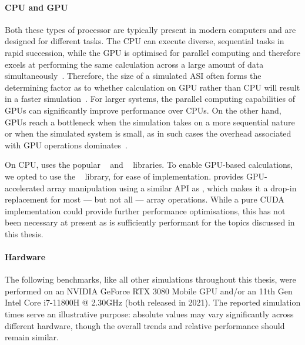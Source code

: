 \paragraph{CPU and GPU}
Both these types of processor are typically present in modern computers and are designed for different tasks.
The CPU can execute diverse, sequential tasks in rapid succession, while the GPU is optimised for parallel computing and therefore excels at performing the same calculation across a large amount of data simultaneously~\cite{owens2008gpu}.
Therefore, the size of a simulated ASI often forms the determining factor as to whether calculation on GPU rather than CPU will result in a faster simulation~\cite{lee2010debunking}.
For larger systems, the parallel computing capabilities of GPUs can significantly improve performance over CPUs.
On the other hand, GPUs reach a bottleneck when the simulation takes on a more sequential nature or when the simulated system is small, as in such cases the overhead associated with GPU operations dominates~\cite{owens2008gpu}. \par
On CPU, \hotspice uses the popular ~\cite{NumPy} and ~\cite{SciPy} libraries.
To enable GPU-based calculations, we opted to use the ~\cite{CuPy} library, for ease of implementation.
 provides GPU-accelerated array manipulation using a similar API as , which makes it a drop-in replacement for most --- but not all --- array operations.
While a pure CUDA implementation could provide further performance optimisations, this has not been necessary at present as  is sufficiently performant for the topics discussed in this thesis.

\paragraph{Hardware}\label{sec:2:hardware}\label{hardware}
The following benchmarks, like all other simulations throughout this thesis, were performed on an NVIDIA GeForce RTX 3080 Mobile GPU and/or an 11th Gen Intel\textregistered{} Core\texttrademark{} i7-11800H @ 2.30GHz (both released in 2021).
The reported simulation times serve an illustrative purpose: absolute values may vary significantly across different hardware, though the overall trends and relative performance should remain similar. \par

